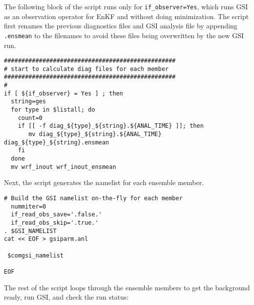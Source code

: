 The following block of the script runs only for \verb|if_observer=Yes|, which runs GSI as an observation operator for EnKF and without doing minimization. The script first renames the previous diagnostics files and GSI analysis file by appending \verb| .ensmean| to the filenames to avoid these files being overwritten by the new GSI run.

\begin{footnotesize}
\begin{verbatim}
#################################################
# start to calculate diag files for each member
#################################################
#
if [ ${if_observer} = Yes ] ; then
  string=ges
  for type in $listall; do
    count=0
    if [[ -f diag_${type}_${string}.${ANAL_TIME} ]]; then
       mv diag_${type}_${string}.${ANAL_TIME} diag_${type}_${string}.ensmean
    fi
  done
  mv wrf_inout wrf_inout_ensmean
\end{verbatim}
\end{footnotesize}

Next, the script generates the namelist for each ensemble member.

\begin{footnotesize}
\begin{verbatim}
# Build the GSI namelist on-the-fly for each member
  nummiter=0
  if_read_obs_save='.false.'
  if_read_obs_skip='.true.'
. $GSI_NAMELIST
cat << EOF > gsiparm.anl

 $comgsi_namelist

EOF
\end{verbatim}
\end{footnotesize}

The rest of the script loops through the ensemble members to get the background ready, run GSI, and check the run status: 

